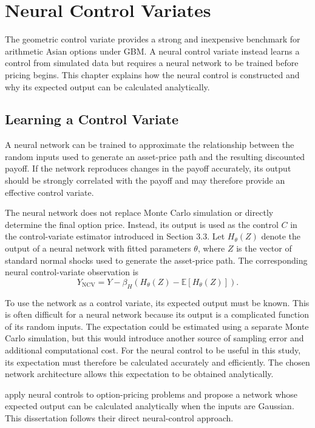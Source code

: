 \chapter{Neural Control Variates}
\label{chap:neural-control-variates}

The geometric control variate provides a strong and inexpensive benchmark for arithmetic Asian options under GBM. A neural control variate instead learns a control from simulated data but requires a neural network to be trained before pricing begins. This chapter explains how the neural control is constructed and why its expected output can be calculated analytically.

\section{Learning a Control Variate}
\label{sec:learning-neural-control}

A neural network can be trained to approximate the relationship between the random inputs used to generate an asset-price path and the resulting discounted payoff. If the network reproduces changes in the payoff accurately, its output should be strongly correlated with the payoff and may therefore provide an effective control variate.

The neural network does not replace Monte Carlo simulation or directly determine the final option price. Instead, its output is used as the control \(C\) in the control-variate estimator introduced in Section 3.3. Let \(H_\theta(Z)\) denote the output of a neural network with fitted parameters \(\theta\), where \(Z\) is the vector of standard normal shocks used to generate the asset-price path. The corresponding neural control-variate observation is
\[
Y_{\mathrm{NCV}}
=
Y
-
\beta_H
\left(
H_\theta(Z)
-
\mathbb{E}[H_\theta(Z)]
\right).
\]

To use the network as a control variate, its expected output must be known. This is often difficult for a neural network because its output is a complicated function of its random inputs. The expectation could be estimated using a separate Monte Carlo simulation, but this would introduce another source of sampling error and additional computational cost. For the neural control to be useful in this study, its expectation must therefore be calculated accurately and efficiently. The chosen network architecture allows this expectation to be obtained analytically.

\textcite{elfilali2021} apply neural controls to option-pricing problems and propose a network whose expected output can be calculated analytically when the inputs are Gaussian. This dissertation follows their direct neural-control approach.

